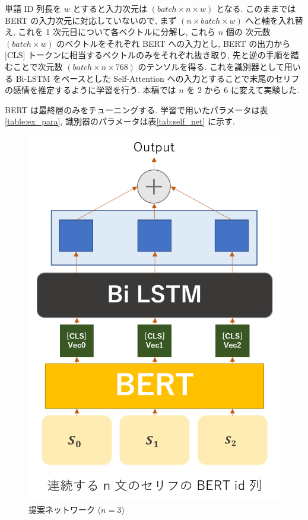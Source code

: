 \documentclass[twocolumn]{jarticle}     %
\begin{document}
単語 ID 列長を $w$ とすると入力次元は $(batch \times n \times w)$ となる. このままでは BERT の入力次元に対応していないので, まず $(n \times batch \times w)$ へと軸を入れ替え, これを 1 次元目について各ベクトルに分解し, これら $n$ 個の 次元数 $(batch \times w)$ のベクトルをそれぞれ BERT への入力とし, BERT の出力から [CLS] トークンに相当するベクトルのみをそれぞれ抜き取り, 先と逆の手順を踏むことで次元数 $(batch \times n \times 768)$ のテンソルを得る. これを識別器として用いる Bi-LSTM をベースとした Self-Attention への入力とすることで末尾のセリフの感情を推定するように学習を行う. 本稿では $n$ を 2 から 6 に変えて実験した.

BERT は最終層のみをチューニングする. 学習で用いたパラメータは表\ref{table:ex_para}, 識別器のパラメータは表\ref{tab:self_net} に示す.

\begin{figure}[!htb]
  \begin{center}
    \includegraphics[scale=0.5]{seq_net.png}
    \caption{提案ネットワーク ($n = 3$)} %
    \label{fig:net} %
  \end{center}
\end{figure}
\end{document}
